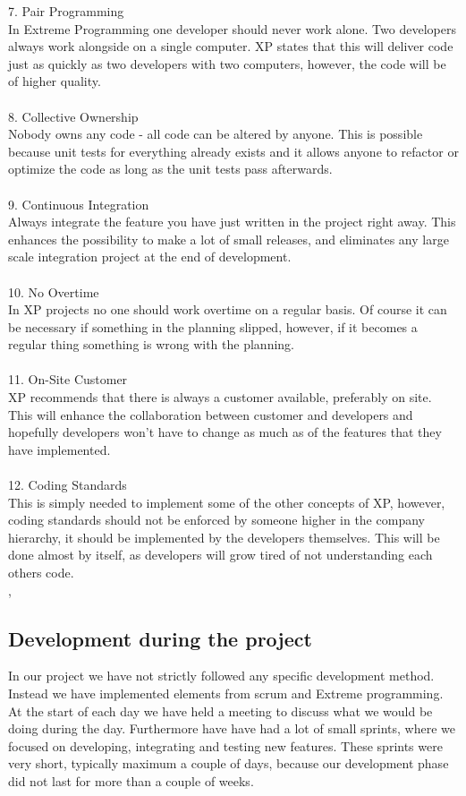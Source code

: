 7. Pair Programming\\
In Extreme Programming one developer should never work alone. Two developers always work alongside on a single computer. XP states that this will deliver code just as quickly as two developers with two computers, however, the code will be of higher quality.\\
 \\
8. Collective Ownership\\
Nobody owns any code - all code can be altered by anyone. This is possible because unit tests for everything already exists and it allows anyone to refactor or optimize the code as long as the unit tests pass afterwards.\\
 \\
9. Continuous Integration\\
Always integrate the feature you have just written in the project right away. This enhances the possibility to make a lot of small releases, and eliminates any large scale integration project at the end of development.\\
 \\
10. No Overtime\\
In XP projects no one should work overtime on a regular basis. Of course it can be necessary if something in the planning slipped, however, if it becomes a regular thing something is wrong with the planning.\\
 \\
11. On-Site Customer\\
XP recommends that there is always a customer available, preferably on site. This will enhance the collaboration between customer and developers and hopefully developers won't have to change as much as of the features that they have implemented.\\
 \\
12. Coding Standards\\
This is simply needed to implement some of the other concepts of XP, however, coding standards should not be enforced by someone higher in the company hierarchy, it should be implemented by the developers themselves. This will be done almost by itself, as developers will grow tired of not understanding each others code. \\

\cite{xp}, \cite{xp2}
\subsection{Development during the project}
In our project we have not strictly followed any specific development method. Instead we have implemented elements from scrum and Extreme programming. At the start of each day we have held a meeting to discuss what we would be doing during the day. Furthermore have have had a lot of small sprints, where we focused on developing, integrating and testing new features. These sprints were very short, typically maximum a couple of days, because our development phase did not last for more than a couple of weeks.

